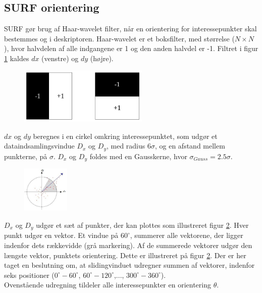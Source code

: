 \subsection{SURF orientering}
SURF gør brug af Haar-wavelet filter, når en orientering for interessepunkter skal bestemmes og i deskriptoren. Haar-wavelet er et boksfilter, med størrelse ($N\times N$), hvor halvdelen af alle indgangene er 1 og den anden halvdel er -1. Filtret i figur \ref{fig:haarwavelet} kaldes $dx$ (venstre) og $dy$ (højre).
\begin{figure}[H]
    \centering
    \includegraphics[width=0.55\textwidth]{fig/haarwavelet.png}
     \vspace{-1em}
    \begin{center}    
       \caption{\textcolor{gray}{\footnotesize \textit{ }}}
    \label{fig:haarwavelet}
     \end{center}
     \vspace{-2.5em}
  \end{figure} \noindent
$dx$ og $dy$ beregnes i en cirkel omkring interessepunktet, som udgør et dataindsamlingsvindue $D_x$ og $D_y$, med radius $6\sigma$, og en afstand mellem punkterne, på $\sigma$. $D_x$ og $D_y$ foldes med en Gausskerne, hvor $\sigma_{Gauss} = 2.5\sigma$.
\begin{figure}[H]
    \centering
    \includegraphics[width=0.2\textwidth]{fig/surforientation.jpg}
     \vspace{-1em}
    \begin{center}    
       \caption{\textcolor{gray}{\footnotesize \textit{ }}}
    \label{fig:surforientation}
     \end{center}
     \vspace{-2.5em}
  \end{figure} \noindent
$D_x$ og $D_y$ udgør et sæt af punkter, der kan plottes som illustreret figur \ref{fig:surforientation}. Hver punkt udgør en vektor. Et vindue på $60^{\circ}$, summerer alle vektorene, der ligger indenfor dets rækkevidde (grå markering). Af de summerede vektorer udgør den længste vektor, punktets orientering. Dette er illustreret på figur \ref{fig:surforientation}. Der er her taget en beslutning om, at slidingvinduet udregner summen af vektorer, indenfor seks positioner ($0^{\circ}-60^{\circ}$, $60^{\circ}-120^{\circ}$,..., $300^{\circ}-360^{\circ}$).
\\
Ovenstående udregning tildeler alle interessepunkter en orientering $\theta$.
